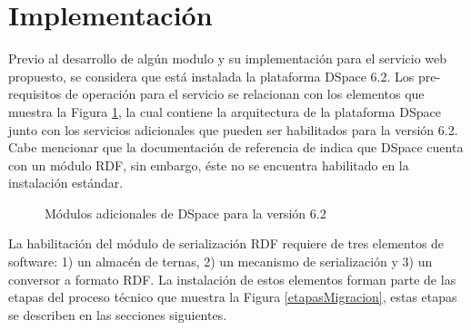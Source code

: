 \section{Implementaci\'on}

Previo al desarrollo de alg\'un modulo y su implementaci\'on para el servicio web propuesto, se considera que est\'a instalada la plataforma DSpace 6.2. Los pre-requisitos de operaci\'on para el servicio se relacionan con los elementos que muestra la Figura \ref{adicionalesDspace}, la cual contiene la arquitectura de la plataforma DSpace junto con los servicios adicionales que pueden ser habilitados para la versi\'on 6.2. Cabe mencionar que la documentaci\'on de referencia de \cite{DSpaceRef} indica que DSpace cuenta con un m\'odulo RDF, sin embargo, \'este no se encuentra habilitado en la instalaci\'on est\'andar.

\begin{figure}[!ht]
	\centering
    \caption{M\'odulos adicionales de DSpace para la versi\'on 6.2} %
    \label{adicionalesDspace}
\end{figure}

La habilitaci\'on del m\'odulo de serializaci\'on RDF requiere de tres elementos de software: 1) un almac\'en de ternas, 2) un mecanismo de serializaci\'on y 3) un conversor a formato RDF. La instalaci\'on de estos elementos forman parte de las etapas del proceso t\'ecnico que muestra la Figura \ref{etapasMigracion}, estas etapas se describen en las secciones siguientes.

